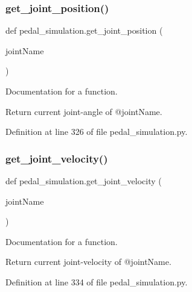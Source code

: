 \subsubsection{\texorpdfstring{get\_joint\_position()}{get\_joint\_position()}}
{\footnotesize\ttfamily def pedal\+\_\+simulation.\+get\+\_\+joint\+\_\+position (\begin{DoxyParamCaption}\item[{}]{joint\+Name }\end{DoxyParamCaption})}



Documentation for a function. 

Return current joint-\/angle of @joint\+Name. 

Definition at line 326 of file pedal\+\_\+simulation.\+py.


\begin{DoxyCode}{0}

\end{DoxyCode}
\mbox{\label{namespacepedal__simulation_af79c2f95fafc2b7a446b98f5dd471d34}} 
\subsubsection{\texorpdfstring{get\_joint\_velocity()}{get\_joint\_velocity()}}
{\footnotesize\ttfamily def pedal\+\_\+simulation.\+get\+\_\+joint\+\_\+velocity (\begin{DoxyParamCaption}\item[{}]{joint\+Name }\end{DoxyParamCaption})}



Documentation for a function. 

Return current joint-\/velocity of @joint\+Name. 

Definition at line 334 of file pedal\+\_\+simulation.\+py.


